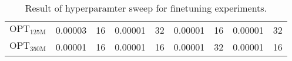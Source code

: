 {\begin{table*}[#1]
{\begin{tabular}{
    l@{\hskip 0.1in}
    c
    c@{\hskip 0.4in}
    c
    c@{\hskip 0.4in}
    c
    c@{\hskip 0.4in}
    c
    c
}
$\text{OPT}_\text{125M}$ & 
0.00003&16 & 0.00001&32 & 0.00001&16 & 0.00001&32 \\

$\text{OPT}_\text{350M}$ & 
0.00001&16 & 0.00001&16 & 0.00001&32 & 0.00001&16 \\



\bottomrule
\end{tabular}
}
\caption{Result of hyperparamter sweep for finetuning experiments.}
\label{tab:sweep_results}
\end{table*}{}

}